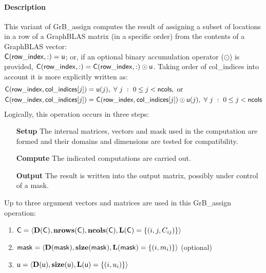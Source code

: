 \paragraph{Description}

This variant of {\sf GrB\_assign} computes the result of assigning a subset of
locations in a row of a GraphBLAS matrix (in a specific order) from the 
contents of a GraphBLAS vector: \\
${\sf C}({\sf row\_index},:) = {\sf u}$; or, if an 
optional binary accumulation operator ($\odot$) is provided, 
${\sf C}({\sf row\_index},:) = 
{\sf C}({\sf row\_index},:) \odot {\sf u}$. Taking order of {\sf col\_indices}
into account it is more explicitly written as:
\[
\begin{aligned}
    {\sf C}({\sf row\_index},{\sf col\_indices}[j]) = &\ {\sf u}(j),
    \ \forall \ j \ : \ 0 \leq j < {\sf ncols}, \mbox{~or~}
    \\
    {\sf C}({\sf row\_index},{\sf col\_indices}[j]) = &\ 
    {\sf C}({\sf row\_index},{\sf col\_indices}[j]) \odot {\sf u}(j),
    \ \forall \ j \ : \ 0 \leq j < {\sf ncols}
\end{aligned}
\]
Logically, this operation occurs in three steps:
\begin{enumerate}[leftmargin=0.75in]
\item[\bf Setup] The internal matrices, vectors and mask used in the computation are formed 
and their domains and dimensions are tested for compatibility.
\item[\bf Compute] The indicated computations are carried out.
\item[\bf Output] The result is written into the output matrix, possibly under 
control of a mask.
\end{enumerate}

Up to three argument vectors and matrices are used in this {\sf GrB\_assign} 
operation:
\begin{enumerate}
	\item ${\sf C} = \langle \bold{D}({\sf C}),\bold{nrows}({\sf C}),
    \bold{ncols}({\sf C}),\bold{L}({\sf C}) = \{(i,j,C_{ij}) \} \rangle$

	\item ${\sf mask} = \langle \bold{D}({\sf mask}),\bold{size}({\sf mask}),
    \bold{L}({\sf mask}) = \{(i,m_i) \} \rangle$ (optional)

	\item ${\sf u} = \langle \bold{D}({\sf u}),\bold{size}({\sf u}),
    \bold{L}({\sf u}) = \{(i,u_i) \} \rangle$
\end{enumerate}


